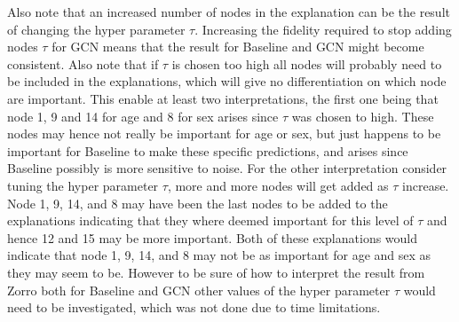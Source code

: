 Also note that an increased number of nodes in the explanation can be the result of changing the hyper parameter $\tau$. Increasing the fidelity required to stop adding nodes $\tau$ for GCN means that the result for Baseline and GCN might become consistent. Also note that if $\tau$ is chosen too high all nodes will probably need to be included in the explanations, which will give no differentiation on which node are important. This enable at least two interpretations, the first one being that node 1, 9 and 14 for age and 8 for sex arises since $\tau$ was chosen to high. These nodes may hence  not really be important for age or sex, but just happens to be important for Baseline to make these specific predictions, and arises since Baseline possibly is more sensitive to noise. For the other interpretation consider tuning the hyper parameter $\tau$, more and more nodes will get added as $\tau$ increase. Node 1, 9, 14, and 8 may have been the last nodes to be added to the explanations indicating that they where deemed important for this level of $\tau$ and hence 12 and 15 may be more important. Both of these explanations would indicate that node 1, 9, 14, and 8 may not be as important for age and sex as they may seem to be. However to be sure of how to interpret the result from Zorro both for Baseline and GCN other values of the hyper parameter $\tau$ would need to be investigated, which was not done due to time limitations. 


